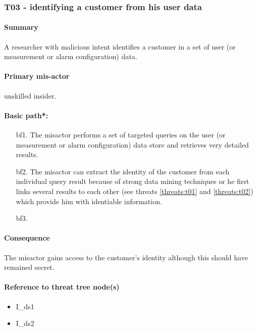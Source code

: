 \subsubsection{T03 - identifying a customer from his user data}
\label{threats:t03}

\paragraph{Summary}

\npar A researcher with malicious intent identifies a customer in a set of user
(or measurement or alarm configuration) data.

\paragraph{Primary mis-actor}

\npar unskilled insider.

\paragraph{Basic path*:}
\begin{enumerate}
	\item[bf1.] The misactor performs a set of targeted queries on the user
	(or measurement or alarm configuration) data store and retrieves very detailed
	results.
    \item[bf2.] The misactor can extract the identity of the customer from each
    individual query result because of strong data mining techniques or he first
    links several results to each other (see threats \ref{threats:t01} and
    \ref{threats:t02}) which provide him with identiable information.
    \item[bf3.]
\end{enumerate}

\paragraph{Consequence}

\npar The misactor gains access to the customer's identity although this should
have remained secret.

\paragraph{Reference to threat tree node(s)}

\begin{itemize}
  \item I\_ds1
  \item I\_ds2
\end{itemize}

